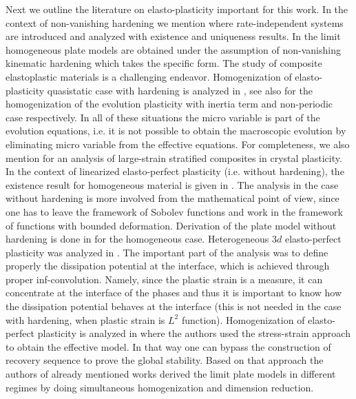 \documentclass[reqno,10pt]{amsart}
\numberwithin{equation}{section}
\theoremstyle{remark}
\begin{document}
Next we outline the literature on elasto-plasticity important for this work.
In the context of non-vanishing hardening we mention \cite{Mielke.2005, Mielke.Roubicek.2015} where rate-independent systems are introduced and analyzed with existence and uniqueness results.
In \cite{Liero.Mielke.2011,Liero.Roche.2012} the limit homogeneous plate models are obtained under the assumption of non-vanishing kinematic hardening which takes the specific form.
The study of composite elastoplastic materials is a challenging endeavor.
Homogenization of elasto-plasticity quasistatic case with hardening is analyzed in \cite{Mielke.Timofte.2007}, see also \cite{Schweizer.Veneroni.2010, Schweizer.Veneroni.2015, Heida.Schweizer.2016, Heida.Schweizer.2018} for the homogenization of the evolution plasticity with inertia term and non-periodic case respectively.
In all of these situations the micro variable is part of the evolution equations, i.e. it is not possible to obtain the macroscopic evolution by eliminating micro variable from the effective equations.
For completeness, we also mention \cite{Cristowiak.Kreisbeck.2020, Cristowiak.Kreisbeck.2017, Davoli.Ferreira.Kreisbeck.2021, Davoli.Kreisbeck.2022} for an analysis of large-strain stratified composites in crystal plasticity.
In the context of linearized elasto-perfect plasticity (i.e. without hardening), the existence result for homogeneous material is given in \cite{DalMaso.DeSimone.Mora.2006}.
The analysis in the case without hardening is more involved from the mathematical point of view, since one has to leave the framework of Sobolev functions and work in the framework of functions with bounded deformation.
Derivation of the plate model without hardening is done in \cite{Davoli.Mora.2013,Davoli.Mora.2015} for the homogeneous case.
Heterogeneous $3d$ elasto-perfect plasticity was analyzed in \cite{Francfort.Giacomini.2012}.
The important part of the analysis was to define properly the dissipation potential at the interface, which is achieved through proper inf-convolution.
Namely, since the plastic strain is a measure, it can concentrate at the interface of the phases and thus it is important to know how the dissipation potential behaves at the interface (this is not needed in the case with hardening, when plastic strain is $L^2$ function).
Homogenization of elasto-perfect plasticity is analyzed in \cite{Francfort.Giacomini.2014} where the authors used the stress-strain approach to obtain the effective model.
In that way one can bypass the construction of recovery sequence to prove the global stability.
Based on that approach the authors of already mentioned works \cite{Buzancic.Davoli.Velcic.2024.1st, Buzancic.Davoli.Velcic.2024.2nd} derived the limit plate models in different regimes by doing simultaneous homogenization and dimension reduction.
\end{document}
